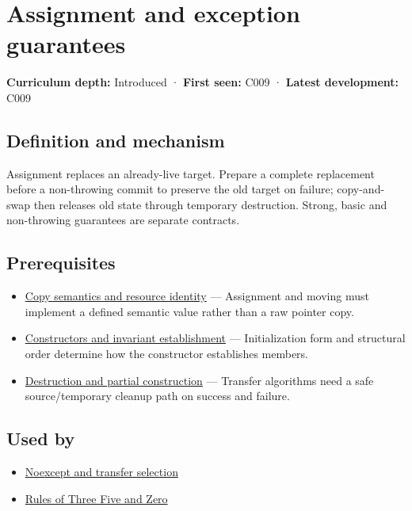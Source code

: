 \hypertarget{appendix-bea6beb5350f}{}
\section{Assignment and exception guarantees}\label{appendix-bea6beb5350f-assignment-and-exception-guarantees}

\textbf{Curriculum depth:} Introduced · \textbf{First seen:} C009 · \textbf{Latest development:} C009

\subsection{Definition and mechanism}\label{appendix-bea6beb5350f-definition-and-mechanism}

Assignment replaces an already-live target. Prepare a complete replacement before a non-throwing commit to preserve the old target on failure; copy-and-swap then releases old state through temporary destruction. Strong, basic and non-throwing guarantees are separate contracts.

\subsection{Prerequisites}\label{appendix-bea6beb5350f-prerequisites}

\begin{itemize}
\tightlist
\item
  \hyperref[appendix-1340cd1ce582]{Copy semantics and resource identity} --- Assignment and moving must implement a defined semantic value rather than a raw pointer copy.
\item
  \hyperref[appendix-7f8ec83d0886]{Constructors and invariant establishment} --- Initialization form and structural order determine how the constructor establishes members.
\item
  \hyperref[appendix-9bfe377cef7a]{Destruction and partial construction} --- Transfer algorithms need a safe source/temporary cleanup path on success and failure.
\end{itemize}

\subsection{Used by}\label{appendix-bea6beb5350f-used-by}

\begin{itemize}
\tightlist
\item
  \hyperref[appendix-c746afaa47d1]{Noexcept and transfer selection}
\item
  \hyperref[appendix-7679107d057e]{Rules of Three Five and Zero}
\end{itemize}

